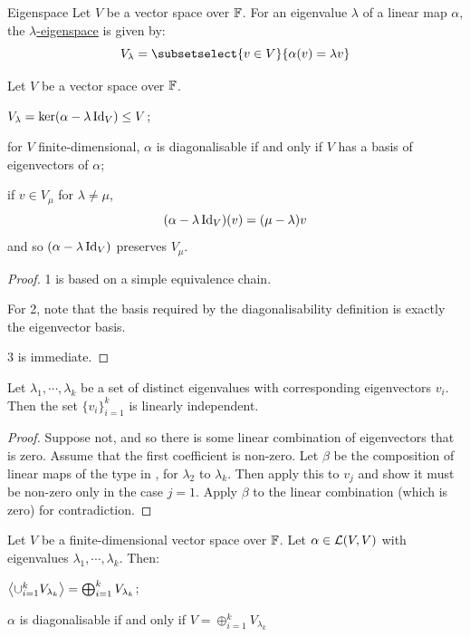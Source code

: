 \documentclass[../Main.tex]{subfiles}
\begin{document}
\begin{definition}{Eigenspace}
    Let $V$ be a vector space over $\mathbb{F}$. For an eigenvalue $\lambda$ of a linear map $\alpha$, the \underline{$\lambda$-eigenspace} is given by:
    \begin{equation*}
        V_\lambda = \subsetselect{v \in V}{\alpha(v) = \lambda v}
    \end{equation*}
\end{definition}
\begin{propositions}{
        Let $V$ be a vector space over $\mathbb{F}$.
        \label{propsESpaceProps}
    }
    \item $V_\lambda = \ker(\alpha - \lambda \operatorname{Id}_V) \leq V$; \label{propESpaceKernel}
    \item for $V$ finite-dimensional, $\alpha$ is diagonalisable if and only if $V$ has a basis of eigenvectors of $\alpha$; \label{propDiagByBasis}
    \item if $v \in V_\mu$ for $\lambda \neq \mu$,
        \begin{equation*}
            (\alpha - \lambda \operatorname{Id}_V)(v) = (\mu - \lambda) v
        \end{equation*}
        and so $(\alpha - \lambda \operatorname{Id}_V)$ preserves $V_\mu$. \label{propPreserveESpaces}
\end{propositions}
\begin{proof}
    1 is based on a simple equivalence chain.

    For 2, note that the basis required by the diagonalisability definition is exactly the eigenvector basis.

    3 is immediate.
\end{proof}
\begin{lemma}
    Let $\lambda_1, \cdots, \lambda_k$ be a set of distinct eigenvalues with corresponding eigenvectors $v_i$. Then the set $\{v_i\}_{i=1}^k$ is linearly independent.
    \label{lemEVectorsDiffEValsLI}
\end{lemma}
\begin{proof}
    Suppose not, and so there is some linear combination of eigenvectors that is zero. Assume that the first coefficient is non-zero. Let $\beta$ be the composition of linear maps of the type in , for $\lambda_2$ to $\lambda_k$. Then apply this to $v_j$ and show it must be non-zero only in the case $j = 1$. Apply $\beta$ to the linear combination (which is zero) for contradiction.
\end{proof}
\begin{propositions}{
        Let $V$ be a finite-dimensional vector space over $\mathbb{F}$. Let $\alpha \in \mathcal{L}(V, V)$ with eigenvalues $\lambda_1, \cdots, \lambda_k$. Then:
        \label{propsESpacesDirSums}
    }
    \item $\left\langle \cup_{i=1}^k V_{\lambda_k} \right\rangle = \bigoplus_{i=1}^k V_{\lambda_k}$; \label{propSpanESpaces}
    \item $\alpha$ is diagonalisable if and only if $V = \oplus_{i=1}^k V_{\lambda_k}$ \label{propDiagIffESpacesFill}
\end{propositions}
\end{document}
